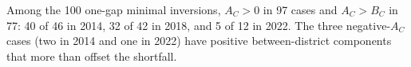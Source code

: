 \documentclass[11pt]{article}
\begin{document}
Among the 100  one-gap minimal inversions, \(A_C>0\) in 97 cases and
\(A_C>B_C\) in 77: 40 of 46 in 2014, 32 of 42 in 2018, and 5 of 12 in 2022.
The three negative-\(A_C\) cases (two in 2014 and one in 2022) have positive
between-district components that more than offset the shortfall.

\end{document}
